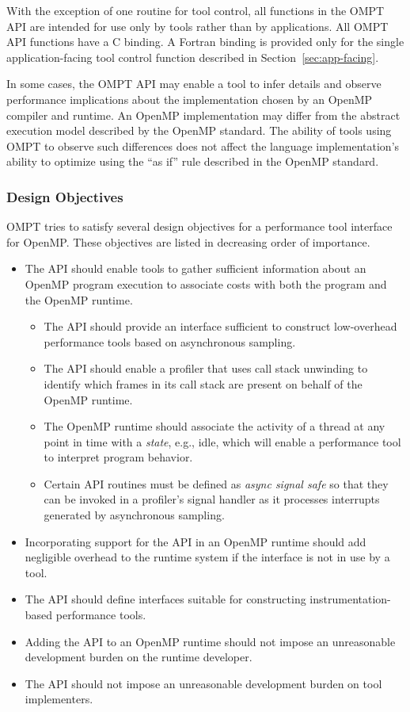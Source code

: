 \documentclass{article}
\begin{document}
With the exception of one routine for tool control, all functions in the OMPT API are intended for use only by tools rather than by applications. All OMPT API functions  have a C binding. A Fortran binding is  provided only for the single application-facing tool control function described in Section~\ref{sec:app-facing}.

In some cases, the OMPT API may enable a tool to infer details and observe performance implications about the implementation chosen by an OpenMP compiler and runtime. An OpenMP implementation may differ from the abstract execution model described by the OpenMP standard. The ability of tools using OMPT  to observe such differences does not affect the language implementation's ability to optimize using the ``as if'' rule described in the OpenMP standard.

\subsubsection{Design Objectives}
OMPT tries to satisfy several design objectives for a performance tool interface for OpenMP. These objectives are listed in decreasing order of importance.
\begin{itemize}
\item The API should enable tools to gather sufficient information about an OpenMP program execution to associate costs with both the program and the OpenMP runtime.
\begin{itemize}
\item The API should provide an interface sufficient to construct low-overhead performance tools based on asynchronous sampling.
\item The API should enable a profiler that uses call stack unwinding to identify which frames in its call stack are present on behalf of the OpenMP runtime.
\item The OpenMP runtime should associate the activity of a thread at any point in time with a {\em state}, e.g., idle, which will enable a performance tool to interpret program behavior.  
\item Certain API routines must be defined as {\em async signal safe} so that they can be invoked in a profiler's signal handler as it processes interrupts generated by asynchronous sampling.
\end{itemize}
\item Incorporating support for the  API in an OpenMP runtime should add negligible overhead to the runtime system if the interface is not in use by a tool.
\item The API should define interfaces suitable for constructing  instrumentation-based performance tools.
\item Adding the API to an OpenMP runtime should not impose an unreasonable development burden on the runtime developer.
\item The API should not impose an unreasonable development burden on tool implementers.
\end{itemize}
\end{document}
